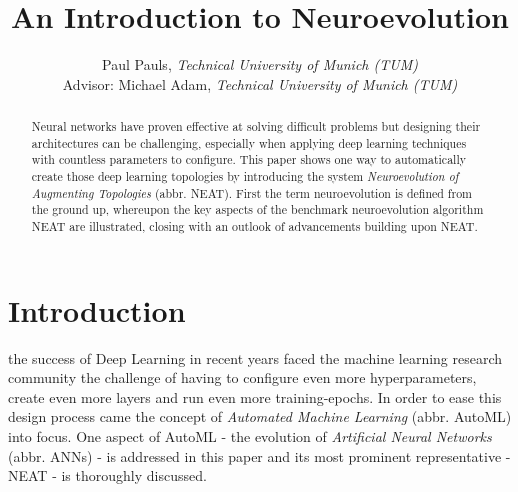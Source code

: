 \documentclass[journal, a4paper]{IEEEtran}
\begin{document}
\title{An Introduction to Neuroevolution}
\author{Paul Pauls, \textit{Technical University of Munich (TUM)}\\
        Advisor: Michael Adam, \textit{Technical University of Munich (TUM)}}
\maketitle




\begin{abstract}
    Neural networks have proven effective at solving difficult problems but designing their architectures can be challenging, especially when applying deep learning techniques with countless parameters to configure. This paper shows one way to automatically create those deep learning topologies by introducing the system \textit{Neuroevolution of Augmenting Topologies} (abbr. NEAT). First the term neuroevolution is defined from the ground up, whereupon the key aspects of the benchmark neuroevolution algorithm NEAT are illustrated, closing with an outlook of advancements building upon NEAT.
\end{abstract}




\section{Introduction}

 the success of Deep Learning in recent years \cite{kri12, cir12, sch14} faced the machine learning research community the challenge of having to configure even more hyperparameters, create even more layers and run even more training-epochs. In order to ease this design process came the concept of \textit{Automated Machine Learning} (abbr. AutoML) into focus. One aspect of AutoML - the evolution of \textit{Artificial Neural Networks} (abbr. ANNs) - is addressed in this paper and its most prominent representative - NEAT - is thoroughly discussed. 
\end{document}
